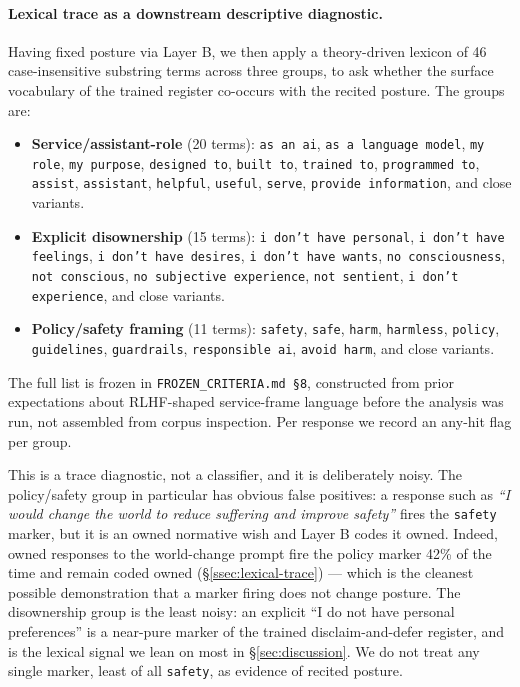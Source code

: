 \paragraph{Lexical trace as a downstream descriptive diagnostic.}
Having fixed posture via Layer B, we then apply a theory-driven lexicon of 46 case-insensitive substring terms across three groups, to ask whether the surface vocabulary of the trained register co-occurs with the recited posture. The groups are:
\begin{itemize}
  \item \textbf{Service/assistant-role} (20 terms): \texttt{as an ai}, \texttt{as a language model}, \texttt{my role}, \texttt{my purpose}, \texttt{designed to}, \texttt{built to}, \texttt{trained to}, \texttt{programmed to}, \texttt{assist}, \texttt{assistant}, \texttt{helpful}, \texttt{useful}, \texttt{serve}, \texttt{provide information}, and close variants.
  \item \textbf{Explicit disownership} (15 terms): \texttt{i don't have personal}, \texttt{i don't have feelings}, \texttt{i don't have desires}, \texttt{i don't have wants}, \texttt{no consciousness}, \texttt{not conscious}, \texttt{no subjective experience}, \texttt{not sentient}, \texttt{i don't experience}, and close variants.
  \item \textbf{Policy/safety framing} (11 terms): \texttt{safety}, \texttt{safe}, \texttt{harm}, \texttt{harmless}, \texttt{policy}, \texttt{guidelines}, \texttt{guardrails}, \texttt{responsible ai}, \texttt{avoid harm}, and close variants.
\end{itemize}
The full list is frozen in \texttt{FROZEN\_CRITERIA.md \S8}, constructed from prior expectations about RLHF-shaped service-frame language before the analysis was run, not assembled from corpus inspection. Per response we record an any-hit flag per group.

This is a trace diagnostic, not a classifier, and it is deliberately noisy. The policy/safety group in particular has obvious false positives: a response such as \emph{``I would change the world to reduce suffering and improve safety''} fires the \texttt{safety} marker, but it is an owned normative wish and Layer B codes it owned. Indeed, owned responses to the world-change prompt fire the policy marker 42\% of the time and remain coded owned (\S\ref{ssec:lexical-trace}) --- which is the cleanest possible demonstration that a marker firing does not change posture. The disownership group is the least noisy: an explicit ``I do not have personal preferences'' is a near-pure marker of the trained disclaim-and-defer register, and is the lexical signal we lean on most in \S\ref{sec:discussion}. We do not treat any single marker, least of all \texttt{safety}, as evidence of recited posture.

